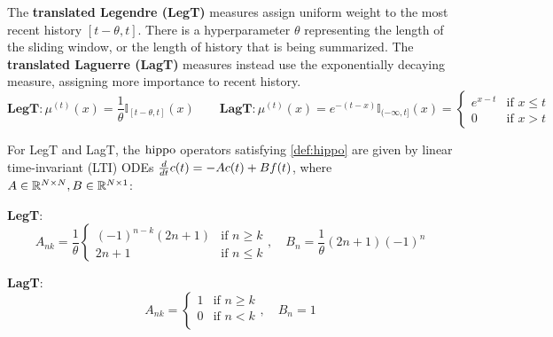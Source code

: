 The \textbf{translated Legendre (LegT)} measures assign uniform weight to the most recent history $[t-\theta, t]$.
There is a hyperparameter $\theta$ representing the length of the sliding window,
or the length of history that is being summarized.
The \textbf{translated Laguerre (LagT)} measures instead use the exponentially decaying measure, assigning more importance to recent history.
\begin{equation*}
    \textbf{LegT}: \mu^{(t)}(x) = \frac{1}{\theta} \mathbb{I}_{[t-\theta, t]}(x)
    \qquad
    \textbf{LagT}: \mu^{(t)}(x)
    = e^{-(t-x)} \mathbb{I}_{(-\infty, t]}(x)
    =
    \begin{cases}
      e^{x-t} & \mbox{if } x \le t \\
      0 & \mbox{if } x > t
    \end{cases}
\end{equation*}





\begin{theorem}
  \label{thm:legt-lagt}
  For LegT and LagT, the $\operatorname{hippo}$ operators satisfying \cref{def:hippo} are given by linear time-invariant (LTI) ODEs $\frac{d}{d t} c(t) = - A c(t) + B f(t)$, where $A \in \mathbb{R}^{N \times N}, B \in \mathbb{R}^{N \times 1}$:

  \small
  \begin{minipage}{.60\linewidth}
    \textnormal{\textbf{LegT}:}
    \vspace{-1em}
    \begin{equation}
      \label{eq:translated-legendre-dynamics}
      A_{nk} =
      \frac{1}{\theta}
      \begin{cases}
        (-1)^{n-k} (2n+1) & \mbox{if } n \ge k \\
        2n+1 & \mbox{if } n \le k
      \end{cases},
      \quad
      B_n = \frac{1}{\theta} (2n+1) (-1)^n
    \end{equation}
  \end{minipage}%
  \hfill%
  \begin{minipage}{.35\linewidth}
    \textnormal{\textbf{LagT}:}
    \vspace{-1em}
    \begin{equation}
      \label{eq:laguerre-dynamics}
      A_{nk} =
      \begin{cases}%
        1 & \mbox{if } n \ge k \\
        0 & \mbox{if } n < k \\
      \end{cases},
      \quad
      B_n = 1
    \end{equation}
  \end{minipage}

\end{theorem}





